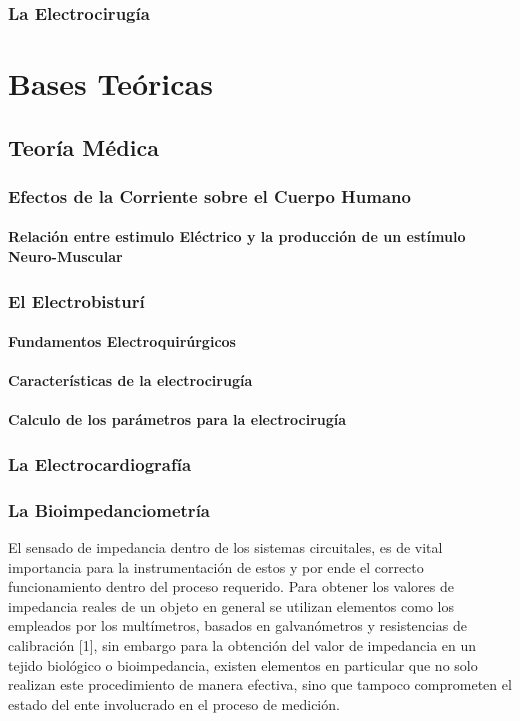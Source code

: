 \documentclass[12pt,letterpaper,spanish]{article}
\begin{document}
			
			\subsubsection{La Electrocirugía}
			
	
	\section{Bases Teóricas}
		\subsection{Teoría Médica}
			\subsubsection{Efectos de la Corriente sobre el Cuerpo Humano}	
				\paragraph{Relación entre estimulo Eléctrico y la producción de un estímulo Neuro-Muscular }	
			\subsubsection{El Electrobisturí}
				\paragraph{Fundamentos Electroquirúrgicos}
				\paragraph{Características de la electrocirugía}
				\paragraph{Calculo de los parámetros para la electrocirugía}
			\subsubsection{La Electrocardiografía}
			\subsubsection{La Bioimpedanciometría}
			El sensado de impedancia dentro de los sistemas circuitales, es de vital importancia para la 	instrumentación de estos y por ende el correcto funcionamiento dentro del proceso requerido. Para obtener los valores de impedancia reales de un objeto en general se utilizan elementos como los empleados por los multímetros, basados en galvanómetros y resistencias de calibración [1], sin embargo para la obtención del valor de impedancia en un tejido biológico o bioimpedancia, existen elementos en particular que no solo realizan este procedimiento de manera efectiva, sino que tampoco comprometen el estado del ente involucrado en el proceso de medición.
			
\end{document}
